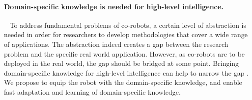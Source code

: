 \paragraph*{Domain-specific knowledge is needed for high-level intelligence. }~
To address fundamental problems of co-robots, a certain level of abstraction is needed in order for researchers to develop methodologies that cover a wide range of applications. The abstraction indeed creates a gap between the research problem and the specific real world application.  However, as co-robots are to be deployed in the real world, the gap should be bridged at some point. Bringing domain-specific knowledge for high-level intelligence can help to narrow the gap .    
We propose to equip the robot with the domain-specific knowledge, and enable fast adaptation and learning of domain-specific knowledge. 

